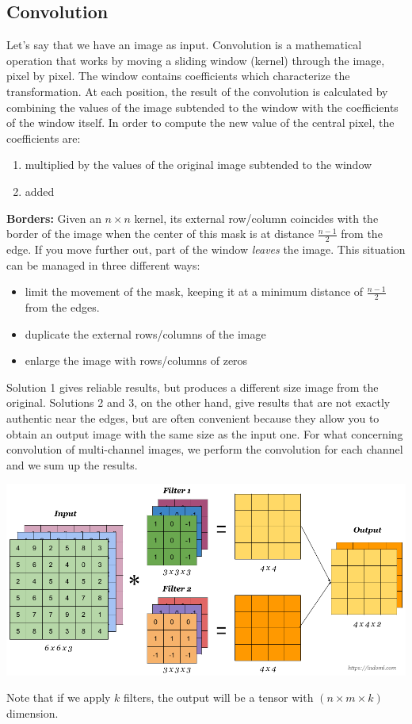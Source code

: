 \subsection{Convolution}
Let's say that we have an image as input. Convolution is a mathematical operation that works by moving a sliding window (kernel) through the image, pixel by pixel. The window contains coefficients which characterize the transformation. At each position, the result of the convolution is calculated by combining the values of the image subtended to the window with the coefficients of the window itself. In order to compute the new value of the central pixel, the coefficients are:
\begin{enumerate}
    \item multiplied by the values of the original image subtended to the window
    \item added
\end{enumerate}
\textbf{Borders:}\newline
Given an $n \times n$ kernel, its external row/column coincides with the border of the image when the center of this mask is at distance $\frac{n-1}{2}$ from the edge. If you move further out, part of the window \textit{leaves} the image.\newline
This situation can be managed in three different ways:
\begin{itemize}
    \item limit the movement of the mask, keeping it at a minimum distance of $\frac{n-1}{2}$ from the edges.
    \item duplicate the external rows/columns of the image
    \item enlarge the image with rows/columns of zeros
\end{itemize}
Solution 1 gives reliable results, but produces a different size image from the original. Solutions 2 and 3, on the other hand, give results that are not exactly authentic near the edges, but are often convenient because they allow you to obtain an output image with the same size as the input one.\newline\newline
For what concerning convolution of multi-channel images, we perform the convolution for each channel and we sum up the results.
\begin{center}
    \includegraphics[scale = 0.3]{images/Convolution.png}
\end{center}
Note that if we apply $k$ filters, the output will be a tensor with $(n \times m \times k)$ dimension. 

